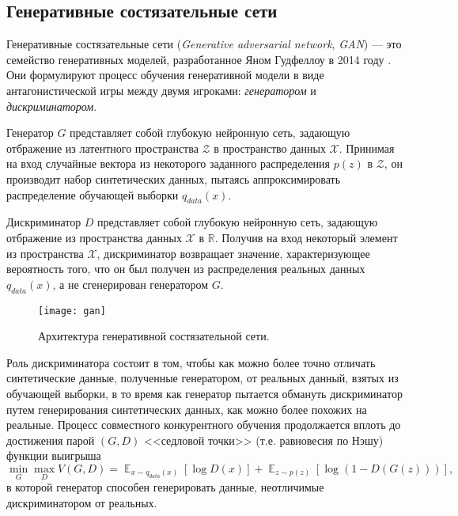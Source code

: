 
\subsection{Генеративные состязательные сети}

Генеративные состязательные сети (\emph{Generative adversarial network},  \emph{GAN}) --- это семейство генеративных моделей, разработанное Яном Гудфеллоу в 2014 году \cite{goodfellow2014generative}.  Они формулируют процесс обучения  генеративной модели в виде антагонистической игры между двумя игроками: \emph{генератором} и \emph{дискриминатором}.

Генератор $G$ представляет собой глубокую нейронную сеть, задающую отбражение из латентного пространства $\mathcal Z$ в пространство данных $\mathcal X$.
Принимая на вход случайные вектора из некоторого заданного распределения $p(z)$ в $\mathcal Z$, он производит набор синтетических данных, пытаясь аппроксимировать распределение обучающей выборки $q_{data}(x)$.

Дискриминатор $D$ представляет собой глубокую нейронную сеть, задающую отбражение из пространства данных $\mathcal X$ в $\mathbb R$. Получив на вход некоторый элемент из пространства $\mathcal X$, дискриминатор возвращает значение, характеризующее вероятность того, что он был получен из распределения реальных данных $q_{data}(x)$, а не сгенерирован генератором $G$.

\begin{figure}[h]
\begin{center}
    \texttt{[image: gan]}
    \caption{Архитектура генеративной состязательной сети.}
    \label{fig:subim11}
\end{center}
\end{figure}

Роль дискриминатора состоит в том, чтобы как можно более точно отличать синтетические данные, полученные генератором, от реальных данный, взятых из обучающей выборки, в то время как генератор пытается обмануть дискриминатор путем генерирования синтетических данных, как можно более похожих на реальные.
Процесс совместного конкурентного обучения продолжается вплоть до достижения парой $(G, D)$ <<седловой точки>> (т.е. равновесия по Нэшу) \cite{goodfellow2017nips} функции выигрыша
$$
\min_{G} \max_{D} V(G, D) = \mathop{\mathbb{E}}_{x \sim q_{data}(x)} [\log D(x)] + \mathop{\mathbb{E}}_{z \sim p(z)} [\log (1 - D(G(z)))] ,
$$
в которой генератор способен генерировать данные, неотличимые дискриминатором от реальных.

